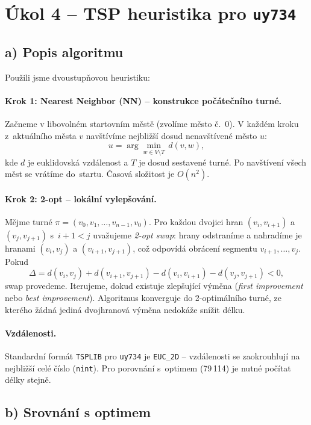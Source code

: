 \documentclass[11pt,a4paper]{article}
\begin{document}
	\section*{Úkol 4 -- TSP heuristika pro \texttt{uy734}}
	
	\subsection*{a) Popis algoritmu}
	
	Použili jsme dvoustupňovou heuristiku:
	
	\paragraph{Krok 1: Nearest Neighbor (NN) -- konstrukce počátečního turné.}
	Začneme v libovolném startovním městě (zvolíme město č.~0). V každém kroku z~aktuálního města $v$ navštívíme nejbližší dosud nenavštívené město $u$:
	\[
	u = \arg\min_{w\in V\setminus T}\, d(v,w),
	\]
	kde $d$ je euklidovská vzdálenost a $T$ je dosud sestavené turné. Po navštívení všech měst se vrátíme do~startu. Časová složitost je $O(n^2)$.
	
	\paragraph{Krok 2: 2-opt -- lokální vylepšování.}
	Mějme turné $\pi=(v_0,v_1,\ldots,v_{n-1},v_0)$. Pro každou dvojici hran $(v_i,v_{i+1})$ a $(v_j,v_{j+1})$ s~$i+1<j$ uvažujeme \emph{2-opt swap}: hrany odstraníme a nahradíme je hranami $(v_i,v_j)$ a $(v_{i+1},v_{j+1})$, což odpovídá obrácení segmentu $v_{i+1},\ldots,v_j$. Pokud
	\[
	\Delta = d(v_i,v_j)+d(v_{i+1},v_{j+1}) - d(v_i,v_{i+1}) - d(v_j,v_{j+1}) < 0,
	\]
	swap provedeme. Iterujeme, dokud existuje zlepšující výměna (\emph{first improvement} nebo \emph{best improvement}). Algoritmus konverguje do 2-optimálního turné, ze kterého žádná jediná dvojhranová výměna nedokáže snížit délku.
	
	\paragraph{Vzdálenosti.}
	Standardní formát \texttt{TSPLIB} pro \texttt{uy734} je \texttt{EUC\_2D} -- vzdálenosti se zaokrouhlují na nejbližší celé číslo (\texttt{nint}). Pro porovnání s~optimem (79\,114) je nutné počítat délky stejně.
	
	\subsection*{b) Srovnání s optimem}
	
\end{document}
